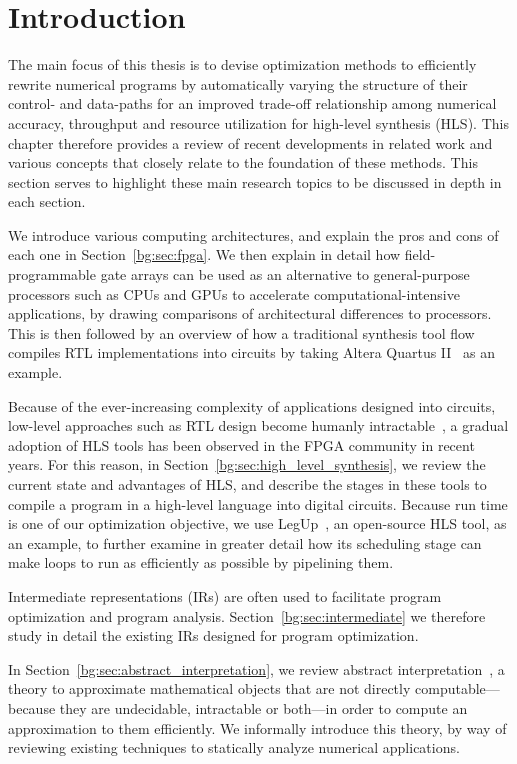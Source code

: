 \section{Introduction}
\label{bg:sec:introduction}

The main focus of this thesis is to devise optimization methods to efficiently
rewrite numerical programs by automatically varying the structure of their
control- and data-paths for an improved trade-off relationship among numerical
accuracy, throughput and resource utilization for high-level synthesis (HLS).
This chapter therefore provides a review of recent developments in related work
and various concepts that closely relate to the foundation of these methods.
This section serves to highlight these main research topics to be discussed in
depth in each section.

We introduce various computing architectures, and explain the pros and cons
of each one in Section~\ref{bg:sec:fpga}.  We then explain in detail how
field-programmable gate arrays can be used as an alternative to general-purpose
processors such as CPUs and GPUs to accelerate computational-intensive
applications, by drawing comparisons of architectural differences to
processors.  This is then followed by an overview of how a traditional
synthesis tool flow compiles RTL implementations into circuits by taking Altera
Quartus II~\cite{quartus} as an example.

Because of the ever-increasing complexity of applications designed
into circuits, low-level approaches such as RTL design become humanly
intractable~\cite{gajski}, a gradual adoption of HLS tools has been
observed in the FPGA community in recent years.  For this reason, in
Section~\ref{bg:sec:high_level_synthesis}, we review the current state and
advantages of HLS, and describe the stages in these tools to compile a program
in a high-level language into digital circuits.  Because run time is one of our
optimization objective, we use LegUp~\cite{legup}, an open-source HLS tool, as
an example, to further examine in greater detail how its scheduling stage can
make loops to run as efficiently as possible by pipelining them.

Intermediate representations (IRs) are often used to facilitate program
optimization and program analysis.  Section~\ref{bg:sec:intermediate} we
therefore study in detail the existing IRs designed for program optimization.

In Section~\ref{bg:sec:abstract_interpretation}, we review abstract
interpretation~\cite{cousot77}, a theory to approximate mathematical objects
that are not directly computable---because they are undecidable, intractable or
both---in order to compute an approximation to them efficiently.  We informally
introduce this theory, by way of reviewing existing techniques to statically
analyze numerical applications.

